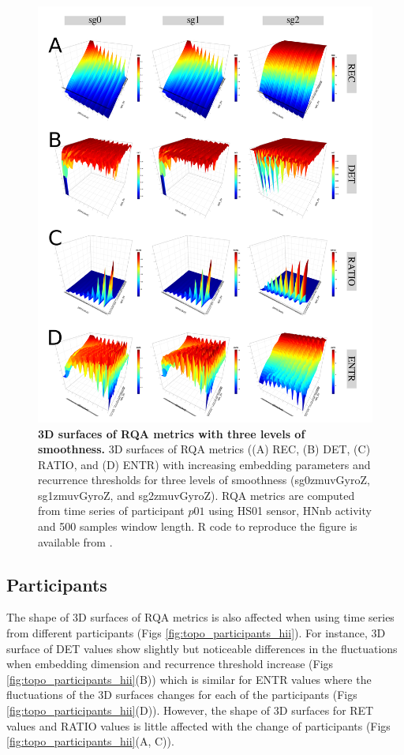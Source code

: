 \begin{figure}[!ht]
\centering
\includegraphics[width=1.0\textwidth]{smoothness_w500}
    \caption{
	{\bf 3D surfaces of RQA metrics with three levels of smoothness.}
	3D surfaces of RQA metrics ((A) REC, (B) DET, (C) RATIO, and (D) ENTR) 
	with increasing embedding parameters and recurrence thresholds for 
	three levels of smoothness 
	(sg0zmuvGyroZ, sg1zmuvGyroZ, and sg2zmuvGyroZ).
	RQA metrics are computed from time series of participant $p01$ using 
	HS01 sensor, HNnb activity and 500 samples window length.
	R code to reproduce the figure is available from \cite{hwum2018}.
 }
\label{fig:topo_smoothness_hii}
\end{figure}


\subsection{Participants}
The shape of 3D surfaces of RQA metrics is also affected when using 
time series from different participants (Figs \ref{fig:topo_participants_hii}).
For instance, 3D surface of DET values show slightly but noticeable 
differences in the fluctuations when embedding dimension and recurrence 
threshold increase (Figs \ref{fig:topo_participants_hii}(B)) which is similar 
for ENTR values where the fluctuations of the 3D surfaces changes for each 
of the participants (Figs \ref{fig:topo_participants_hii}(D)).
However, the shape of 3D surfaces for RET values and RATIO values 
is little affected with the change of participants 
(Figs \ref{fig:topo_participants_hii}(A, C)).

